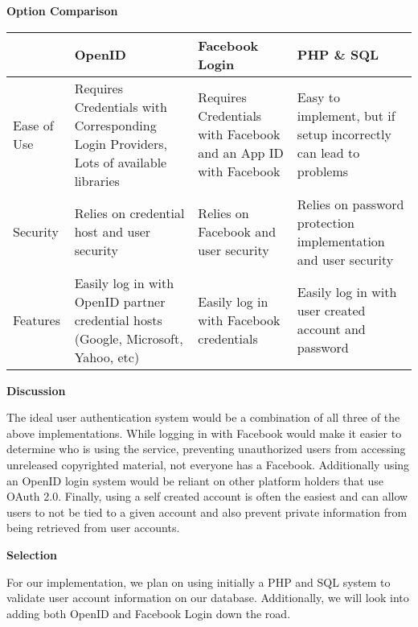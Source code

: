 \documentclass[letterpaper, 10pt, draftclsnofoot, compsoc, onecolumn]{IEEEtran}
\begin{document}
{{ \par}

\vspace{2pc}

\newpage
{\noindent\rmfamily\bfseries\color{black} Option Comparison \par}
\vspace{1pc}
\tablehead{}
\begin{supertabular}{|p{2cm}|p{4cm}|p{4cm}|p{4cm}|}
\hline  & OpenID & Facebook Login & PHP \& SQL\\ \hline
Ease of Use & Requires Credentials with Corresponding Login Providers, Lots of available libraries  & Requires Credentials with Facebook and an App ID with Facebook & Easy to implement, but if setup incorrectly can lead to problems\\ \hline
Security & Relies on credential host and user security & Relies on Facebook and user security & Relies on password protection implementation and user security\\ \hline
Features & Easily log in with OpenID partner credential hosts (Google, Microsoft, Yahoo, etc) & Easily log in with Facebook credentials & Easily log in with user created account and password \\ \hline

\end{supertabular}

\newpage
{\noindent\rmfamily\bfseries\color{black} Discussion \par}
{\noindent The ideal user authentication system would be a combination of all three of the above implementations. While logging in with Facebook would make it easier to determine who is using the service, preventing unauthorized users from accessing unreleased copyrighted material, not everyone has a Facebook. Additionally using an OpenID login system would be reliant on other platform holders that use OAuth 2.0. Finally, using a self created account is often the easiest and can allow users to not be tied to a given account and also prevent private information from being retrieved from user accounts.\par}

\medskip
{\noindent\rmfamily\bfseries\color{black} Selection \par}
{\noindent For our implementation, we plan on using initially a PHP and SQL system to validate user account information on our database. Additionally, we will look into adding both OpenID and Facebook Login down the road. \par}

}
\end{document}
